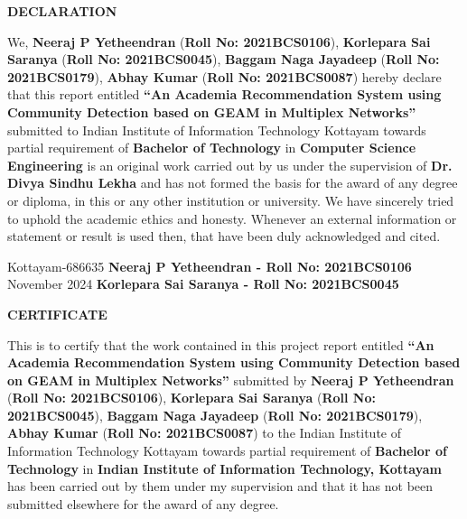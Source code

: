 \documentclass[12pt,a4wide]{report}
\theoremstyle{plain}
\theoremstyle{definition}
\theoremstyle{remark}
\begin{document}
\begin{titlepage}
\begin{center}
\end{center}

\end{titlepage}

\clearpage
 \setcounter{page}{2}
\begin{center}
{\large{\bf{DECLARATION}}}
\end{center}


\noindent We, \textbf{Neeraj P Yetheendran} (\textbf{Roll No: 2021BCS0106}), \textbf{Korlepara Sai Saranya} (\textbf{Roll No: 2021BCS0045}), \textbf{Baggam Naga Jayadeep} (\textbf{Roll No: 2021BCS0179}), \textbf{Abhay Kumar} (\textbf{Roll No: 2021BCS0087})  hereby declare that this report entitled
\textbf{``An Academia Recommendation System using Community Detection based on GEAM in Multiplex Networks''} submitted to Indian
Institute of Information Technology Kottayam towards partial
requirement of {\bf Bachelor of Technology} in \textbf{Computer Science Engineering}
is an original work carried out by us under the supervision of
\textbf{Dr. Divya Sindhu Lekha} and has not formed the basis for the award
of any degree or diploma, in this or any other institution or
university. We have sincerely tried to uphold the academic ethics
and honesty. Whenever an external information or statement or
result is used then, that have been duly acknowledged and cited.

\vspace{4cm}

\noindent Kottayam-686635 
\hfill 
\textbf{Neeraj P Yetheendran - Roll No: 2021BCS0106}
\noindent November  2024
\hfill
\textbf{Korlepara Sai Saranya - Roll No: 2021BCS0045}
\clearpage


 \setcounter{page}{3}
\begin{center}
{\large{\bf{CERTIFICATE}}}
\end{center}


\noindent This is to certify that the work contained in this
project report entitled \textbf{``An Academia Recommendation System using
Community Detection based on GEAM in
Multiplex Networks''}
submitted by \textbf{Neeraj P Yetheendran} (\textbf{Roll No: 2021BCS0106}), \textbf{Korlepara Sai Saranya} (\textbf{Roll No: 2021BCS0045}), \textbf{Baggam Naga Jayadeep} (\textbf{Roll No: 2021BCS0179}), \textbf{Abhay Kumar} (\textbf{Roll No: 2021BCS0087}) to the Indian Institute of Information Technology Kottayam
towards partial requirement of {\bf Bachelor of
Technology} in
\textbf{Indian Institute
of Information Technology, Kottayam} has been carried out by them under my supervision and that it has not been submitted elsewhere for the
award of any degree.
\end{document}
